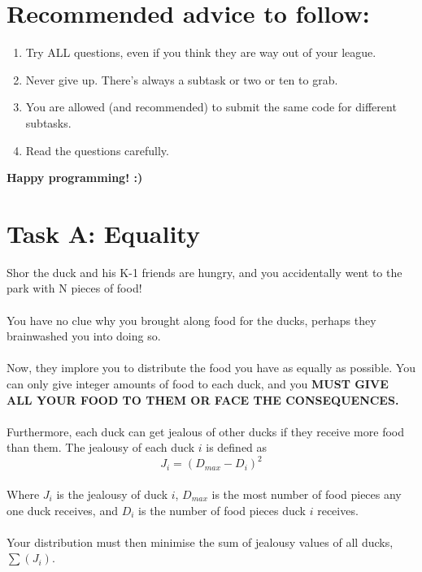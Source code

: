 \documentclass{report}
\begin{document}
\pagebreak

\section*{Recommended advice to follow:}
\begin{enumerate}
    \item Try ALL questions, even if you think they are way out of your league.
    \item Never give up. There's always a subtask or two or ten to grab.
    \item You are allowed (and recommended) to submit the same code for different subtasks.
    \item Read the questions carefully.
\end{enumerate}

\hfill \hfill \hfill \hfill \hfill

\begin{center}
    \textbf{\Huge Happy programming! :)}
\end{center}

\pagebreak
\hfill \break \hfill \break

\section*{Task A: Equality}
Shor the duck and his K-1 friends are hungry, and you accidentally went to the park with N pieces of food!
\\
\\
You have no clue why you brought along food for the ducks, perhaps they brainwashed you into doing so.
\\
\\
Now, they implore you to distribute the food you have as equally as possible. You can only give integer amounts of food to each duck, and you \textbf{MUST GIVE ALL YOUR FOOD TO THEM OR FACE THE CONSEQUENCES.}
\\
\\
Furthermore, each duck can get jealous of other ducks if they receive more food than them. The jealousy of each duck $i$ is defined as\\ \[  J_i = (D_{max} - D_i)^2 \]
\\
Where \(J_i\) is the jealousy of duck $i$, \(D_{max}\) is the most number of food pieces any one duck receives, and \(D_i\) is the number of food pieces duck $i$ receives.
\\
\\
Your distribution must then minimise the sum of jealousy values of all ducks, \(\sum(J_i)\).
\end{document}
